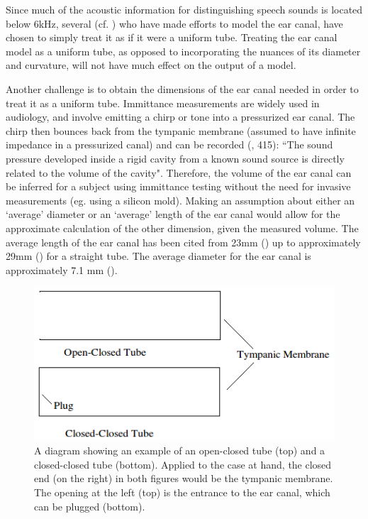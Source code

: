 Since much of the acoustic information for distinguishing speech sounds is located below 6kHz, several (cf. \cite{stinson:89,hansen:97b,stenfelt:07}) who have made efforts to model the ear canal, have chosen to simply treat it as if it were a uniform tube.  Treating the ear canal model as a uniform tube, as opposed to incorporating the nuances of its diameter and curvature, will not have much effect on the output of a model.

Another challenge is to obtain the dimensions of the ear canal needed in order to treat it as a uniform tube. Immittance measurements are widely used in audiology, and involve emitting a chirp or tone into a pressurized ear canal.  The chirp then bounces back from the tympanic membrane (assumed to have infinite impedance in a pressurized canal) and can be recorded (\cite{ballachanda:97}, 415): ``The sound pressure developed inside a rigid cavity from a known sound source is directly related to the volume of the cavity".  Therefore, the volume of the ear canal can be inferred for a subject using immittance testing without the need for invasive measurements (eg. using a silicon mold).  Making an assumption about either an `average' diameter or an `average' length of the ear canal would allow for the approximate calculation of the other dimension, given the measured volume. The average length of the ear canal has been cited from 23mm (\cite{rosen:91}) up to approximately 29mm (\cite{stinson:89}) for a straight tube. The average diameter for the ear canal is approximately 7.1 mm (\cite{salvinelli:91}).

\begin{figure}[h!]
\centering
  \includegraphics{figure/open-closed-tube.png}
  \caption{A diagram showing an example of an open-closed tube (top) and a closed-closed tube (bottom).  Applied to the case at hand, the closed end (on the right) in both figures would be the tympanic membrane.  The opening at the left (top) is the entrance to the ear canal, which can be plugged (bottom).}
  \label{fig:open-closed-tube}
\end{figure}

